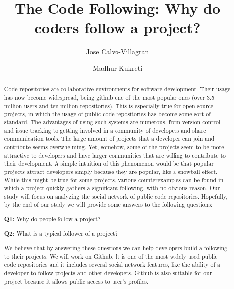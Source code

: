 \documentclass{acm_proc_article-sp}
\begin{document}
\title{The Code Following: Why do coders follow a project?}
\author{
\alignauthor
Jose Calvo-Villagran
\and
\alignauthor
Madhur Kukreti
}

\maketitle

\begin{abstract}
Code  repositories  are  collaborative  environments  for  software development. Their usage has now become widespread, being github one of the most popular ones (over 3.5 million users and ten million repositories). This is especially true for open source projects, in which the usage of public  code  repositories has become some sort  of  standard.  The  advantages of  using  such systems  are  numerous, from version control and issue tracking to getting involved  in  a community of developers and share communication tools. The large amount of projects that a developer can join and contribute seems overwhelming. Yet, somehow,  some  of  the  projects  seem  to  be  more  attractive  to  developers  and  have  larger communities  that  are  willing  to  contribute  to  their  development.  A  simple  intuition  of  this phenomenon would be that popular projects attract developers simply because they are popular, like a snowball effect. While this might be true for some projects, various counterexamples can be found in which  a project quickly gathers a significant following, with no obvious reason. Our study will focus on analyzing the social network of public code repositories. Hopefully, by the end of our study we will provide some answers to the following questions:

\textbf{Q1:} Why do people follow a project?

\textbf{Q2:} What is a typical follower of a project?

We believe that by answering these questions we can help developers build a following to their projects. We will work on Github. It is one of the most widely used public code repositories and it includes several  social  network  features, like the ability of a developer  to  follow  projects  and  other developers.  Github  is  also  suitable for our project  because it allows public access to user's profiles.
\end{abstract}













\end{document}
